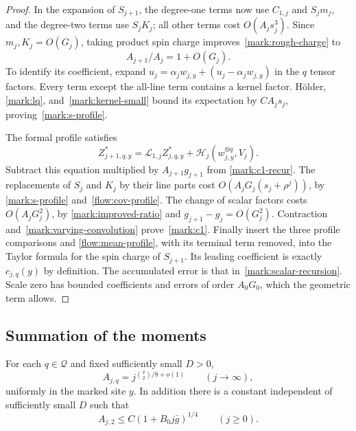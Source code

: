 \begin{proof}
In the expansion of $S_{j+1}$, the degree-one terms now use $C_{1,j}$
and $S_jm_j$, and the degree-two terms use $S_jK_j$; all other terms
cost $O(A_js_j^3)$.  Since $m_j,K_j=O(G_j)$, taking product spin charge
improves~\eqref{mark:rough-charge} to
\begin{equation}\label{mark:improved-ratio}
 A_{j+1}/A_j=1+O(G_j).
\end{equation}
To identify its coefficient, expand
$u_j=\alpha_jw_{j,y}+(u_j-\alpha_jw_{j,y})$ in the $q$ tensor factors.
Every term except the all-line term contains a kernel factor.  Hölder,
\eqref{mark:lq}, and~\eqref{mark:kernel-small} bound its expectation by
$CA_js_j$, proving~\eqref{mark:s-profile}.

The formal profile satisfies
\[
 Z_{j+1,q,y}^*=\mathcal L_{1,j}Z_{j,q,y}^*
                   +\mathcal H_j(w_{j,y}^{\otimes q},V_j).
\]
Subtract this equation multiplied by $A_{j+1}g_{j+1}$ from
\eqref{mark:c1-recur}.  The replacements of $S_j$ and $K_j$ by their
line parts cost $O(A_jG_j(s_j+\rho^j))$, by
\eqref{mark:s-profile} and~\eqref{flow:cov-profile}.
The change of scalar factors costs $O(A_jG_j^2)$, by
\eqref{mark:improved-ratio} and $g_{j+1}-g_j=O(G_j^2)$.
Contraction and~\eqref{mark:varying-convolution} prove~\eqref{mark:c1}.
Finally insert the three profile comparisons and
\eqref{flow:mean-profile}, with its terminal term removed, into the
Taylor formula for the spin charge of $S_{j+1}$.  Its leading
coefficient is exactly $c_{j,q}(y)$ by definition.  The accumulated
error is that in~\eqref{mark:scalar-recursion}.  Scale zero has bounded
coefficients and errors of order $A_0G_0$, which the geometric term
allows.
\end{proof}

\subsection{Summation of the moments}
\begin{proposition}\label{mark:moments}
For each $q\in\mathcal Q$ and fixed sufficiently small
$D>0$,
\begin{equation}\label{mark:asymptotic}
 A_{j,q}=j^{\binom q2/8+o(1)}\qquad(j\to\infty),
\end{equation}
uniformly in the marked site $y$.  In addition there is a constant
independent of sufficiently small $D$ such that
\begin{equation}\label{mark:second-uniform}
 A_{j,2}\le C(1+B_0j\bar g)^{1/4}\qquad(j\ge0).
\end{equation}
\end{proposition}

